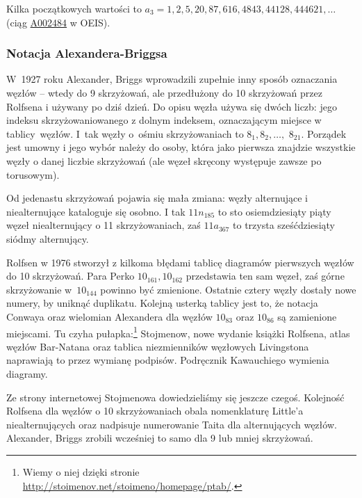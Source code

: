 Kilka początkowych wartości to $a_3 = 1, 2, 5, 20, 87, 616, 4843, 44128, 444621, \ldots$ (ciąg \href{https://oeis.org/A002484}{A002484} w OEIS).

%

\subsubsection{Notacja Alexandera-Briggsa}
\label{alexander_briggs_notation}%
%
W~1927 roku Alexander, Briggs wprowadzili zupełnie inny sposób oznaczania węzłów -- wtedy do 9 skrzyżowań, ale przedłużony do 10 skrzyżowań przez Rolfsena i używany po dziś dzień.
Do opisu węzła używa się dwóch liczb: jego indeksu skrzyżowaniowanego z dolnym indeksem, oznaczającym miejsce w tablicy~węzłów.
I~tak węzły o~ośmiu skrzyżowaniach to $8_1, 8_2, \ldots,$ $8_{21}$.
Porządek jest umowny i jego wybór należy do osoby, która jako pierwsza znajdzie wszystkie węzły o danej liczbie skrzyżowań (ale węzeł skręcony występuje zawsze po torusowym).
%
%

Od jedenastu skrzyżowań pojawia się mała zmiana: węzły alternujące i niealternujące kataloguje się osobno.
I tak $11n_{185}$ to sto osiemdziesiąty piąty węzeł niealternujący o 11 skrzyżowaniach, zaś $11a_{367}$ to trzysta sześćdziesiąty siódmy alternujący.

Rolfsen w 1976 stworzył z kilkoma błędami tablicę diagramów pierwszych węzłów do 10 skrzyżowań.
%
\label{rolfsens_mistake}%
Para Perko $10_{161}, 10_{162}$ przedstawia ten sam węzeł, zaś górne skrzyżowanie w~$10_{144}$ powinno być zmienione.
%
Ostatnie cztery węzły dostały nowe numery, by uniknąć duplikatu.
Kolejną usterką tablicy jest to, że notacja Conwaya oraz wielomian Alexandera dla węzłów $10_{83}$ oraz $10_{86}$ są zamienione miejscami.
Tu czyha pułapka:\footnote{Wiemy o niej dzięki stronie \url{http://stoimenov.net/stoimeno/homepage/ptab/}.} Stojmenow, nowe wydanie książki Rolfsena, atlas węzłów Bar-Natana oraz tablica niezmienników węzłowych Livingstona naprawiają to przez wymianę podpisów.
Podręcznik Kawauchiego wymienia diagramy.

Ze strony internetowej Stojmenowa dowiedzieliśmy się jeszcze czegoś.
Kolejność Rolfsena dla węzłów o 10 skrzyżowaniach obala nomenklaturę Little'a niealternujących oraz nadpisuje numerowanie Taita dla alternujących węzłów.
%
Alexander, Briggs zrobili wcześniej to samo dla 9 lub mniej skrzyżowań.

